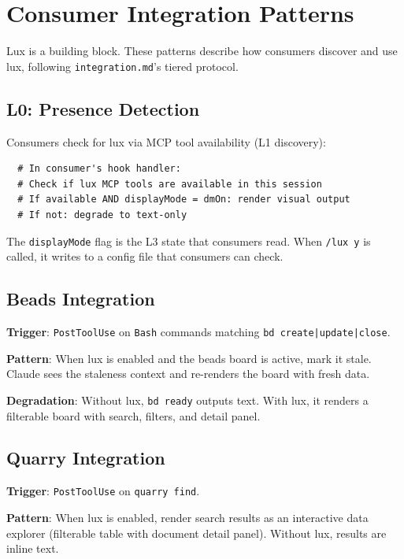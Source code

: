 \documentclass[a4paper,10pt,fleqn]{article}
\begin{document}
\section{Consumer Integration Patterns}

Lux is a building block. These patterns describe how consumers
discover and use lux, following \texttt{integration.md}'s tiered
protocol.

\subsection{L0: Presence Detection}

Consumers check for lux via MCP tool availability (L1 discovery):

\begin{verbatim}
  # In consumer's hook handler:
  # Check if lux MCP tools are available in this session
  # If available AND displayMode = dmOn: render visual output
  # If not: degrade to text-only
\end{verbatim}

The \texttt{displayMode} flag is the L3 state that consumers read.
When \texttt{/lux y} is called, it writes to a config file that
consumers can check.

\subsection{Beads Integration}

\textbf{Trigger}: \texttt{PostToolUse} on \texttt{Bash} commands
matching \texttt{bd create|update|close}.

\textbf{Pattern}: When lux is enabled and the beads board is active,
mark it stale. Claude sees the staleness context and re-renders the
board with fresh data.

\textbf{Degradation}: Without lux, \texttt{bd ready} outputs text.
With lux, it renders a filterable board with search, filters, and
detail panel.

\subsection{Quarry Integration}

\textbf{Trigger}: \texttt{PostToolUse} on \texttt{quarry find}.

\textbf{Pattern}: When lux is enabled, render search results as an
interactive data explorer (filterable table with document detail panel).
Without lux, results are inline text.
\end{document}
